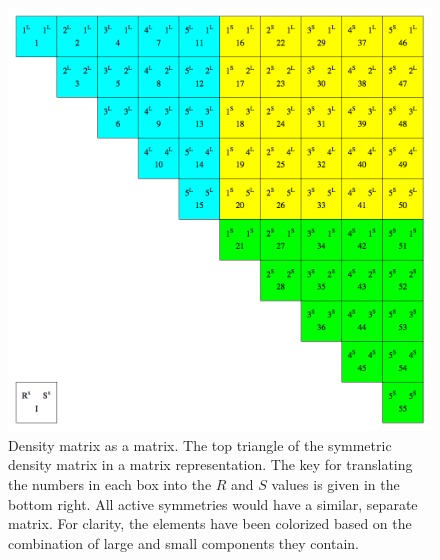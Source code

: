 \begin{figure}
\includegraphics[width=1\textwidth]{Figures/dtmx_mat.png}
\caption[Density matrix as a matrix]
{Density matrix as a matrix. The top triangle of the symmetric density matrix in a matrix representation. The key for translating the numbers in each box into the $R$ and $S$ values is given in the bottom right. All active symmetries would have a similar, separate matrix. For clarity, the elements have been colorized based on the combination of large and small components they contain.}
\label{fig:dtmxmat}
\end{figure}

